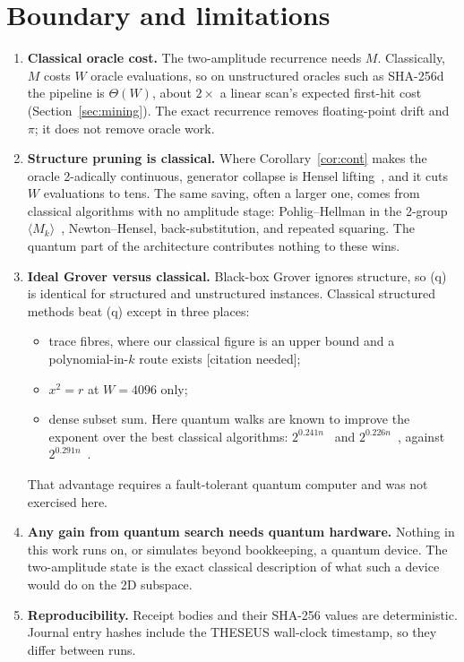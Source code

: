 \documentclass[11pt]{article}
\theoremstyle{definition}
\begin{document}
\section{Boundary and limitations}\label{sec:limits}
\begin{enumerate}
\item \textbf{Classical oracle cost.} The two-amplitude recurrence needs $M$. Classically, $M$ costs $W$ oracle
evaluations, so on unstructured oracles such as SHA-256d the pipeline is $\Theta(W)$, about $2\times$ a linear scan's
expected first-hit cost (Section~\ref{sec:mining}). The exact recurrence removes floating-point drift and $\pi$; it
does not remove oracle work.
\item \textbf{Structure pruning is classical.} Where Corollary~\ref{cor:cont} makes the oracle 2-adically continuous,
generator collapse is Hensel lifting~\cite{koblitz}, and it cuts $W$ evaluations to tens. The same saving, often a
larger one, comes from classical algorithms with no amplitude stage: Pohlig--Hellman in the 2-group
$\langle M_k\rangle$~\cite{ph}, Newton--Hensel, back-substitution, and repeated squaring. The quantum part of the
architecture contributes nothing to these wins.
\item \textbf{Ideal Grover versus classical.} Black-box Grover ignores structure, so (q) is identical for structured
and unstructured instances. Classical structured methods beat (q) except in three places:
\begin{itemize}
\item trace fibres, where our classical figure is an upper bound and a polynomial-in-$k$ route exists
[citation needed];
\item $x^2=r$ at $W=4096$ only;
\item dense subset sum. Here quantum walks are known to improve the exponent over the best classical algorithms:
$2^{0.241n}$~\cite{bjlm} and $2^{0.226n}$~\cite{hm}, against $2^{0.291n}$~\cite{bcj}.
\end{itemize}
That advantage requires a fault-tolerant quantum computer and was not exercised here.
\item \textbf{Any gain from quantum search needs quantum hardware.} Nothing in this work runs on, or simulates beyond
bookkeeping, a quantum device. The two-amplitude state is the exact classical description of what such a device
would do on the 2D subspace.
\item \textbf{Reproducibility.} Receipt bodies and their SHA-256 values are deterministic. Journal entry hashes
include the THESEUS wall-clock timestamp, so they differ between runs.
\end{enumerate}
\end{document}
